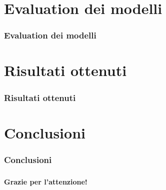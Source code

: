 \documentclass{beamer}
\begin{document}
\section{Evaluation dei modelli}
\begin{frame}
    \frametitle{Evaluation dei modelli}

\end{frame}

\section{Risultati ottenuti}
\begin{frame}
    \frametitle{Risultati ottenuti}

\end{frame}

\section{Conclusioni}
\begin{frame}
    \frametitle{Conclusioni}

\end{frame}

\begin{frame}
    \frametitle{}
    
    \fontsize{30pt}{10pt}\selectfont
    \centering
    \textbf{Grazie per l'attenzione!}
    
\end{frame}
\end{document}
